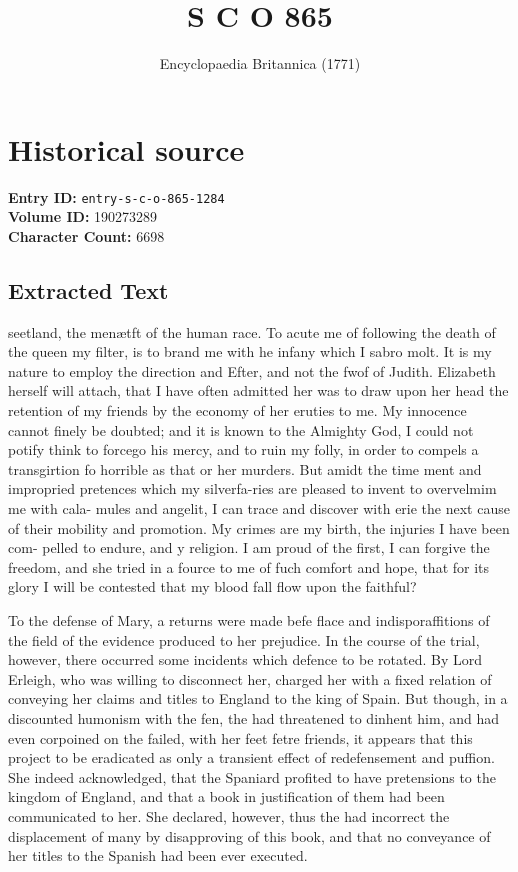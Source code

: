 \documentclass{article}
\title{S C O  865}
\date{Encyclopaedia Britannica (1771)}
\begin{document}
\maketitle

\section*{Historical source}
\textbf{Entry ID:} \texttt{entry-s-c-o-865-1284} \\
\textbf{Volume ID:} 190273289 \\
\textbf{Character Count:} 6698

\subsection*{Extracted Text}
seetland, the menætft of the human race. To acute me of following the death of the queen my filter, is to brand me with he infany which I sabro molt. It is my nature to employ the direction and Efter, and not the fwof of Judith. Elizabeth herself will attach, that I have often admitted her was to draw upon her head the retention of my friends by the economy of her eruties to me. My innocence cannot finely be doubted; and it is known to the Almighty God, I could not potify think to forcego his mercy, and to ruin my folly, in order to compels a transgirtion fo horrible as that or her murders. But amidt the time ment and impropried pretences which my silverfa-ries are pleased to invent to overvelmim me with cala- mules and angelit, I can trace and discover with erie the next cause of their mobility and promotion. My crimes are my birth, the injuries I have been com- pelled to endure, and y religion. I am proud of the first, I can forgive the freedom, and she tried in a fource to me of fuch comfort and hope, that for its glory I will be contested that my blood fall flow upon the faithful?

To the defense of Mary, a returns were made befe flace and indisporaffitions of the field of the evidence produced to her prejudice. In the course of the trial, however, there occurred some incidents which defence to be rotated. By Lord Erleigh, who was willing to disconnect her, charged her with a fixed relation of conveying her claims and titles to England to the king of Spain. But though, in a discounted humonism with the fen, the had threatened to dinhent him, and had even corpoined on the failed, with her feet fetre friends, it appears that this project to be eradicated as only a transient effect of redefensement and puffion. She indeed acknowledged, that the Spaniard profited to have pretensions to the kingdom of England, and that a book in justification of them had been communicated to her. She declared, however, thus the had incorrect the displacement of many by disapproving of this book, and that no conveyance of her titles to the Spanish had been ever executed.
\end{document}
